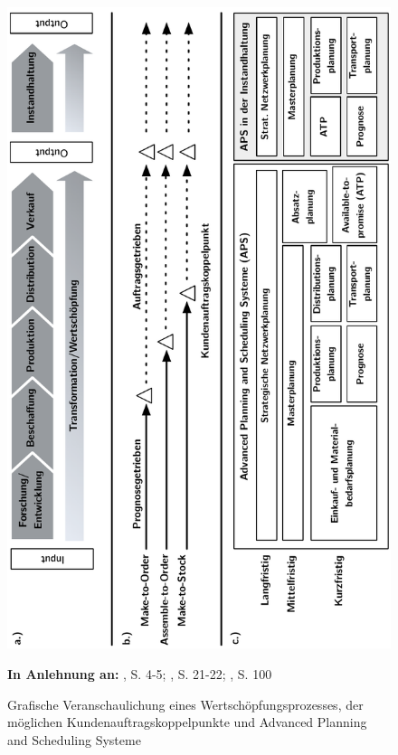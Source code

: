 \begin{figure}[h!]
  \begin{center}
    \includegraphics[width=120mm]{Bilder/prozess.pdf}
    \caption{Grafische Veranschaulichung eines Wertschöpfungsprozesses, der möglichen Kundenauftragskoppelpunkte und Advanced Planning and Scheduling Systeme}  \label{Prozess}
    {\footnotesize \textbf{In Anlehnung an:} \cite{Bach:2012aa}, S. 4-5; \cite{quante2009management}, S. 21-22; \cite{meyr2015structure}, S. 100}
  \end{center}
\end{figure}

